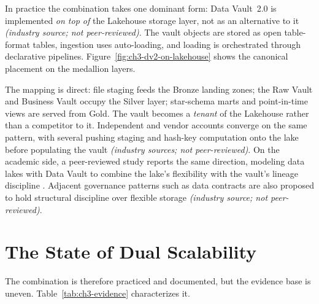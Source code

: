 In practice the combination takes one dominant form: Data Vault~2.0 is implemented \emph{on top of} the Lakehouse storage layer, not as an alternative to it \parencite{databricks2022} \textit{(industry source; not peer-reviewed)}. The vault objects are stored as open table-format tables, ingestion uses auto-loading, and loading is orchestrated through declarative pipelines. Figure~\ref{fig:ch3-dv2-on-lakehouse} shows the canonical placement on the medallion layers.


The mapping is direct: file staging feeds the Bronze landing zones; the Raw Vault and Business Vault occupy the Silver layer; star-schema marts and point-in-time views are served from Gold. The vault becomes a \emph{tenant} of the Lakehouse rather than a competitor to it. Independent and vendor accounts converge on the same pattern, with several pushing staging and hash-key computation onto the lake before populating the vault \parencite{moermans2023, moronta2026} \textit{(industry sources; not peer-reviewed)}. On the academic side, a peer-reviewed study reports the same direction, modeling data lakes with Data Vault to combine the lake's flexibility with the vault's lineage discipline \parencite{giebler2019dv}. Adjacent governance patterns such as data contracts are also proposed to hold structural discipline over flexible storage \parencite{jones2023datacontracts} \textit{(industry source; not peer-reviewed)}.

\section{The State of Dual Scalability}
\label{sec:ch3-state}

The combination is therefore practiced and documented, but the evidence base is uneven. Table~\ref{tab:ch3-evidence} characterizes it.

